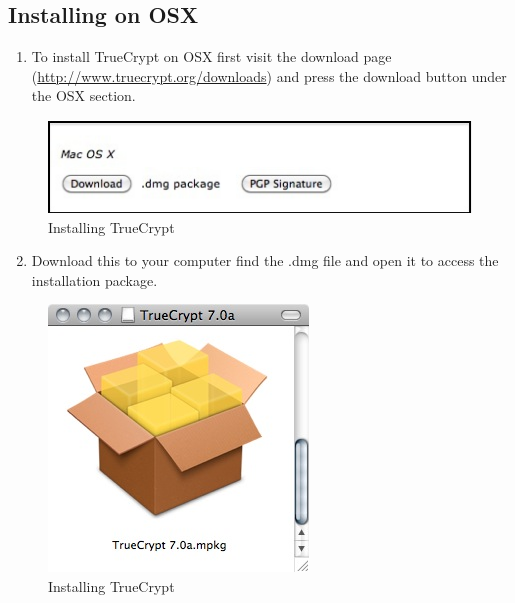 \subsection{Installing on OSX}

\begin{enumerate}[1.]
\item
  To install TrueCrypt on OSX first visit the download page
  (\href{http://www.truecrypt.org/downloads}{http://www.truecrypt.org/downloads})
  and press the download button under the OSX section.
\end{enumerate}
\begin{figure}[htbp]
\centering
\includegraphics{tc_009.jpg}
\caption{Installing TrueCrypt}
\end{figure}

\begin{enumerate}[1.]
\setcounter{enumi}{1}
\item
  Download this to your computer find the .dmg file and open it to
  access the installation package.
\end{enumerate}
\begin{figure}[htbp]
\centering
\includegraphics{tc_010.jpg}
\caption{Installing TrueCrypt}
\end{figure}

